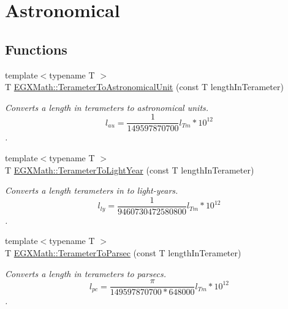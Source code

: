 \hypertarget{group___e_g_x_math-_conversions-_length_conversions-_s_i-_terameter-_astronomical}{}\section{Astronomical}
\label{group___e_g_x_math-_conversions-_length_conversions-_s_i-_terameter-_astronomical}
\subsection*{Functions}
\begin{DoxyCompactItemize}
\item 
{\footnotesize template$<$typename T $>$ }\\T \mbox{\hyperlink{group___e_g_x_math-_conversions-_length_conversions-_s_i-_terameter-_astronomical_gaddabc91d53862a8031cd5438aedb0ed2}{E\+G\+X\+Math\+::\+Terameter\+To\+Astronomical\+Unit}} (const T length\+In\+Terameter)
\begin{DoxyCompactList}\small\item\em Converts a length in terameters to astronomical units. \[ l_{au}= \frac{1}{149597870700} l_{Tm} * 10^{12} \]. \end{DoxyCompactList}\item 
{\footnotesize template$<$typename T $>$ }\\T \mbox{\hyperlink{group___e_g_x_math-_conversions-_length_conversions-_s_i-_terameter-_astronomical_gaf8f6953b6ef57246e02ab136d74ee7a8}{E\+G\+X\+Math\+::\+Terameter\+To\+Light\+Year}} (const T length\+In\+Terameter)
\begin{DoxyCompactList}\small\item\em Converts a length terameters in to light-\/years. \[ l_{ly}= \frac{1}{9460730472580800} l_{Tm} * 10^{12} \]. \end{DoxyCompactList}\item 
{\footnotesize template$<$typename T $>$ }\\T \mbox{\hyperlink{group___e_g_x_math-_conversions-_length_conversions-_s_i-_terameter-_astronomical_gac203b94b19db6ed8181e78413fafcf58}{E\+G\+X\+Math\+::\+Terameter\+To\+Parsec}} (const T length\+In\+Terameter)
\begin{DoxyCompactList}\small\item\em Converts a length in terameters to parsecs. \[ l_{pc}=\frac{\pi}{149597870700 * 648000} l_{Tm} * 10^{12} \]. \end{DoxyCompactList}\end{DoxyCompactItemize}


